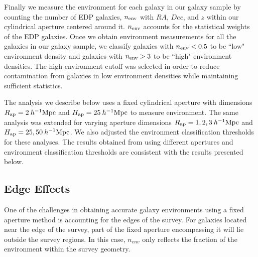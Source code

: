 \documentclass{emulateapj}
\begin{document}
Finally we measure the environment for each galaxy in our galaxy sample by counting the number of EDP galaxies, $n_{\rm{env}}$ with $RA$, $Dec$, and $z$ within our cylindrical aperture centered around it. $n_{\rm{env}}$ accounts for the statistical weights of the EDP galaxies. Once we obtain environment measurements for all the galaxies in our galaxy sample, we classify galaxies with $n_{\rm{env}} < 0.5$ to be ``low" environment density and galaxies with $n_{\rm{env}} > 3$ to be ``high" environment densities. The high environment cutoff was selected in order to reduce contamination from galaxies in low environment densities while maintaining sufficient statistics. 

The analysis we describe below uses a fixed cylindrical aperture with dimensions $R_{\rm{ap}} = 2 \:h^{-1}\rm{Mpc}$ and $H_{\rm{ap}} = 25 \:h^{-1}\rm{Mpc}$ to measure environment. The same analysis was extended for varying aperture dimensions $R_{\rm{ap}} = 1, 2, 3 \: h^{-1}\rm{Mpc}$ and $H_{\rm{ap}} = 25, 50 \:h^{-1}\rm{Mpc}$. We also adjusted the environment classification thresholds for these analyses. The results obtained from using different apertures and environment classification thresholds are consistent with the results presented below.  

\subsection{Edge Effects} \label{sec:edgeeffect}
One of the challenges in obtaining accurate galaxy environments using a fixed aperture method is accounting for the edges of the survey. For galaxies located near the edge of the survey, part of the fixed aperture encompassing it will lie outside the survey regions. In this case, $n_{env}$ only reflects the fraction of the environment within the survey geometry.
\end{document}
